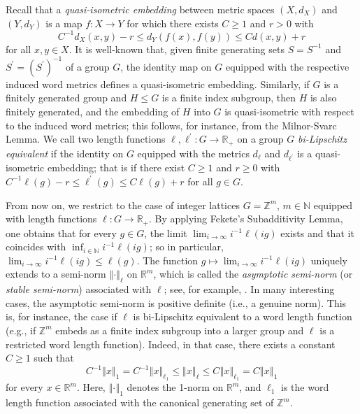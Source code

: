 \documentclass[a4paper,11pt,reqno]{amsart}
\numberwithin{equation}{section}
\numberwithin{equation}{section}
\theoremstyle{definition}
\theoremstyle{remark}
\theoremstyle{remark}
\begin{document}
Recall that a \emph{quasi-isometric embedding} between metric
spaces $(X,d_{X})$ and $(Y,d_{Y})$ is a map $f:X\rightarrow Y$
for which there exists $C\geq1$ and $r>0$ with
\[
C^{-1}d_{X}(x,y)-r\leq d_{Y}(f(x),f(y))\leq Cd(x,y)+r
\]
for all $x,y\in X$. It is well-known that, given finite generating
sets $S=S^{-1}$ and $S^{\prime}=(S^\prime)^{-1}$ of a group $G$, the identity map on $G$
equipped with the respective induced word metrics defines a quasi-isometric
embedding. Similarly, if $G$ is a finitely generated group and $H\leq G$
is a finite index subgroup, then $H$ is also finitely generated, and
the embedding of $H$ into $G$ is quasi-isometric with respect to
the induced word metrics; this follows, for instance, from the Milnor-Svarc
Lemma. We call two length functions $\ell,\ell^{\prime}:G\rightarrow\mathbb{R}_{+}$
on a group $G$ \emph{bi-Lipschitz equivalent} if the identity on
$G$ equipped with the metrics $d_{\ell}$ and $d_{\ell^{\prime}}$
is a quasi-isometric embedding; that is if there exist $C\geq1$ and
$r \geq 0$ with $C^{-1}\ell(g)-r\leq\ell^{\prime}(g)\leq C\ell(g)+r$
for all $g\in G$.

From now on, we restrict to the case of integer lattices $G=\mathbb{Z}^{m}$,
$m\in\mathbb{N}$ equipped with length functions $\ell:G\rightarrow\mathbb{R}_{+}$.
By applying Fekete's Subadditivity Lemma, one obtains that for every
$g\in G$, the limit $\lim_{i\rightarrow\infty}i^{-1}\ell(ig)$ exists
and that it coincides with $\inf_{i\in\mathbb{N}}i^{-1}\ell(ig)$;
so in particular, $\lim_{i\rightarrow\infty}i^{-1}\ell(ig)\leq\ell(g)$.
The function $g\mapsto\lim_{i\rightarrow\infty}i^{-1}\ell(ig)$ uniquely
extends to a semi-norm $\left\Vert \cdot\right\Vert _{\ell}$ on $\mathbb{R}^{m}$,
which is called the \emph{asymptotic semi-norm} (or \emph{stable semi-norm}) associated with $\ell$; see, for example, \cite[Proposition 8.5.3]{BBI01}. In many interesting cases,
the asymptotic semi-norm is positive definite (i.e., a genuine norm). This
is, for instance, the case if $\ell$ is bi-Lipschitz equivalent to
a word length function (e.g., if $\mathbb{Z}^{m}$ embeds as a finite
index subgroup into a larger group and $\ell$ is a restricted word
length function). Indeed, in that case, there exists a constant $C\geq1$
such that 
\[
C^{-1}\left\Vert x\right\Vert _{1}=C^{-1}\left\Vert x\right\Vert _{\ell_{1}}\leq\left\Vert x\right\Vert _{\ell}\leq C\left\Vert x\right\Vert _{\ell_{1}}=C\left\Vert x\right\Vert _{1}
\]
for every $x\in\mathbb{R}^{m}$. Here, $\left\Vert \cdot\right\Vert _{1}$
denotes the 1-norm on $\mathbb{R}^{m}$, and $\ell_{1}$ is the word length function associated with the canonical generating set of $\mathbb{Z}^m$.
\end{document}

